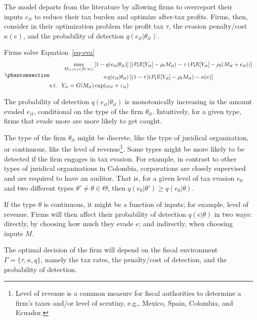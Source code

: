 \documentclass[
  12pt]{article}
\theoremstyle{definition}
\theoremstyle{remark}
\begin{document}
The model departs from the literature by allowing firms to overreport
their inputs \(e_{it}\) to reduce their tax burden and optimize
after-tax profits. Firms, then, consider in their optimization problem
the profit tax \(\tau\), the evasion penalty/cost \(\kappa(e)\), and the
probability of detection \(q(e_{it}|\theta_{it})\).

Firms solve Equation~\ref{eq-eva}
\begin{equation}\phantomsection\label{eq-eva}{
\begin{aligned}
  \max_{M_{it}, e_{it}\in [0,\infty), } [1-q(e_{it}|\theta_{it})]&\left[(P_t\mathbb{E}[Y_{it}]-\rho_{t} M_{it})-\tau\left(P_t\mathbb{E}[Y_{it}]-\rho_{t} (M_{it}+e_{it})\right)\right]\\
  +q(e_{it}|\theta_{it})&\left[(1-\tau)(P_t\mathbb{E}[Y_{it}]-\rho_{t} M_{it})-\kappa(e)\right] \\
  \text{s.t. }\; Y_{it}=G(M_{it})\exp(\omega_{it}+\varepsilon_{it})
\end{aligned}
}\end{equation}

The probability of detection \(q(e_{it}|\theta_{it})\) is monotonically
increasing in the amount evaded \(e_{it}\), conditional on the type of
the firm \(\theta_{it}\). Intuitively, for a given type, firms that
evade more are more likely to get caught.

The type of the firm \(\theta_{it}\) might be discrete, like the type of
juridical organization, or continuous, like the level of
revenue\footnote{Level of revenue is a common measure for fiscal
  authorities to determine a firm's taxes and/or level of scrutiny,
  e.g., Mexico, Spain, Colombia, and Ecuador. }. Some
types might be more likely to be detected if the firm engages in tax
evasion. For example, in contrast to other types of juridical
organizations in Colombia, corporations are closely supervised and are
required to have an auditor. That is, for a given level of tax evasion
\(e_0\) and two different types
\(\theta' \not= \theta \in \mathbfcal{\Theta}\), then
\(q(e_0|\theta')\ge q(e_0|\theta)\).

If the type \(\theta\) is continuous, it might be a function of inputs;
for example, level of revenue. Firms will then affect their probability
of detection \(q(e|\theta)\) in two ways: directly, by choosing how much
they evade \(e\); and indirectly, when choosing inputs \(M\).

The optimal decision of the firm will depend on the fiscal environment
\(\Gamma=\{\tau, \kappa, q \}\), namely the tax rates, the penalty/cost
of detection, and the probability of detection.
\end{document}
